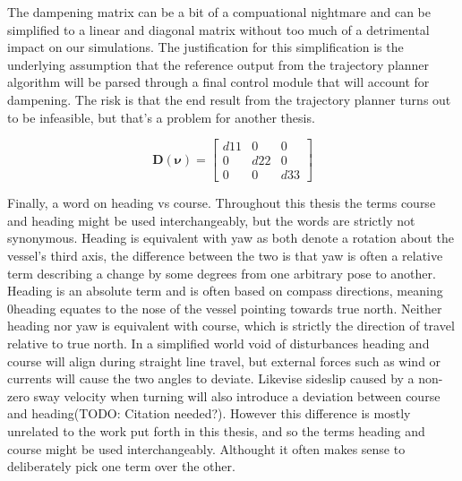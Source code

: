 The dampening matrix can be a bit of a compuational nightmare and can be simplified to a linear and diagonal matrix without too much
of a detrimental impact on our simulations. The justification for this simplification is the underlying assumption that the reference output
from the trajectory planner algorithm will be parsed through a final control module that will account for dampening. The risk is that
the end result from the trajectory planner turns out to be infeasible, but that's a problem for another thesis.

\begin{equation}
    \textbf{D}(\bm{\nu}) = \begin{bmatrix}
                            d11 &   0   &   0\\[-5pt]
                            0   &   d22 &   0\\[-5pt]
                            0   &   0   &   d33
                            \end{bmatrix}
\end{equation}

Finally, a word on heading vs course. Throughout this thesis the terms course and heading might be used interchangeably, but the words are strictly not synonymous.
Heading is equivalent with yaw as both denote a rotation about the vessel's third axis, the difference between the two is that yaw is often a relative term describing
a change by some degrees from one arbitrary pose to another. Heading is an absolute term and is often based on compass directions, meaning 0\textdegree heading
equates to the nose of the vessel pointing towards true north. Neither heading nor yaw is equivalent with course, which is strictly the direction
of travel relative to true north. In a simplified world void of disturbances heading and course will align during straight line
travel, but external forces such as wind or currents will cause the two angles to deviate. Likevise sideslip caused by a non-zero sway velocity when turning will 
also introduce a deviation between course and heading(TODO: Citation needed?). However this difference is mostly unrelated to the work put forth in this thesis, 
and so the terms heading and course might be used interchangeably. Althought it often makes sense to deliberately pick one
term over the other.


